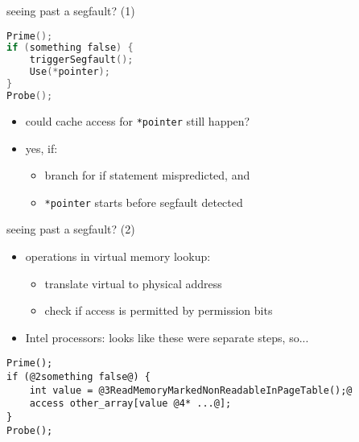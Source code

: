 \begin{frame}[fragile]{seeing past a segfault? (1)}
\begin{lstlisting}[language=C,style=small]
Prime();
if (something false) {
    triggerSegfault();
    Use(*pointer);
}
Probe();
\end{lstlisting}
\begin{itemize}
\item could cache access for \texttt{*pointer} still happen?
\item yes, if:
    \begin{itemize}
    \item branch for if statement mispredicted, and
    \item \texttt{*pointer} starts before segfault detected
    \end{itemize}
\end{itemize}
\end{frame}

\begin{frame}[fragile]{seeing past a segfault? (2)}
\begin{itemize}
\item operations in virtual memory lookup:
    \begin{itemize}
    \item translate virtual to physical address
    \item check if access is permitted by permission bits
    \end{itemize}
\item Intel processors: looks like these were separate steps, so...
\end{itemize}
\begin{lstlisting}
Prime();
if (@2something false@) {
    int value = @3ReadMemoryMarkedNonReadableInPageTable();@
    access other_array[value @4* ...@];
}
Probe();
\end{lstlisting}
\end{frame}
